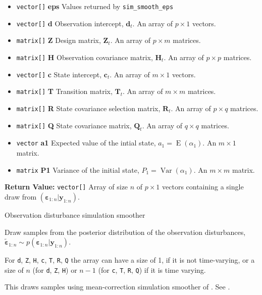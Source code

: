 \documentclass[]{book}
\providecommand{\tightlist}{%
  \setlength{\itemsep}{0pt}\setlength{\parskip}{0pt}}
\DeclareMathOperator{\E}{E}
\DeclareMathOperator{\Var}{Var}
\newcommand{\mat}[1]{\boldsymbol{#1}}
\renewcommand{\vec}[1]{\boldsymbol{#1}}
\begin{document}
\begin{itemize}
\tightlist
\item
  \texttt{vector{[}{]}} \textbf{eps} Values returned by
  \texttt{sim\_smooth\_eps}
\item
  \texttt{vector{[}{]}} \textbf{d} Observation intercept, \(\vec{d}_t\).
  An array of \(p \times 1\) vectors.
\item
  \texttt{matrix{[}{]}} \textbf{Z} Design matrix, \(\mat{Z}_t\). An
  array of \(p \times m\) matrices.
\item
  \texttt{matrix{[}{]}} \textbf{H} Observation covariance matrix,
  \(\mat{H}_t\). An array of \(p \times p\) matrices.
\item
  \texttt{vector{[}{]}} \textbf{c} State intercept, \(\vec{c}_t\). An
  array of \(m \times 1\) vectors.
\item
  \texttt{matrix{[}{]}} \textbf{T} Transition matrix, \(\mat{T}_t\). An
  array of \(m \times m\) matrices.
\item
  \texttt{matrix{[}{]}} \textbf{R} State covariance selection matrix,
  \(\mat{R} _t\). An array of \(p \times q\) matrices.
\item
  \texttt{matrix{[}{]}} \textbf{Q} State covariance matrix,
  \(\mat{Q}_t\). An array of \(q \times q\) matrices.
\item
  \texttt{vector} \textbf{a1} Expected value of the intial state,
  \(a_1 = \E(\alpha_1)\). An \(m \times 1\) matrix.
\item
  \texttt{matrix} \textbf{P1} Variance of the initial state,
  \(P_1 = \Var(\alpha_1)\). An \(m \times m\) matrix.
\end{itemize}

\textbf{Return Value:} \texttt{vector{[}{]}} Array of size \(n\) of
\(p \times 1\) vectors containing a single draw from
\((\vec{\varepsilon}_{1:n} | \vec{y}_{1:n})\).

Observation disturbance simulation smoother

Draw samples from the posterior distribution of the observation
disturbances,
\(\tilde{\vec{\varepsilon}}_{1:n} \sim p(\vec{\varepsilon}_{1:n} | \vec{y}_{1:n})\).

For \texttt{d}, \texttt{Z}, \texttt{H}, \texttt{c}, \texttt{T},
\texttt{R}, \texttt{Q} the array can have a size of 1, if it is not
time-varying, or a size of \(n\) (for \texttt{d}, \texttt{Z},
\texttt{H}) or \(n - 1\) (for \texttt{c}, \texttt{T}, \texttt{R},
\texttt{Q}) if it is time varying.

This draws samples using mean-correction simulation smoother of
\autocite{DurbinKoopman2002}. See \autocite[Sec 4.9]{DurbinKoopman2012}.
\end{document}
